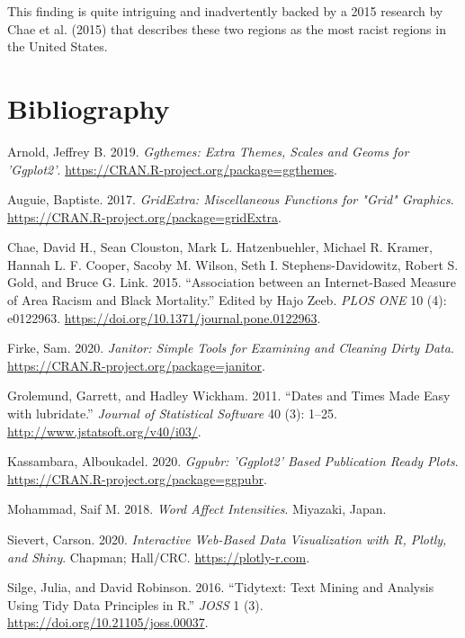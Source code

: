 \documentclass[
]{article}
\begin{document}
This finding is quite intriguing and inadvertently backed by a 2015 research by Chae et al. (2015) that describes these two regions as the most racist regions in the United States.

\hypertarget{bibliography}{%
\section*{Bibliography}\label{bibliography}}

\hypertarget{refs}{}
\leavevmode\hypertarget{ref-ggthemes}{}%
Arnold, Jeffrey B. 2019. \emph{Ggthemes: Extra Themes, Scales and Geoms for 'Ggplot2'}. \url{https://CRAN.R-project.org/package=ggthemes}.

\leavevmode\hypertarget{ref-gridextra}{}%
Auguie, Baptiste. 2017. \emph{GridExtra: Miscellaneous Functions for "Grid" Graphics}. \url{https://CRAN.R-project.org/package=gridExtra}.

\leavevmode\hypertarget{ref-journal}{}%
Chae, David H., Sean Clouston, Mark L. Hatzenbuehler, Michael R. Kramer, Hannah L. F. Cooper, Sacoby M. Wilson, Seth I. Stephens-Davidowitz, Robert S. Gold, and Bruce G. Link. 2015. ``Association between an Internet-Based Measure of Area Racism and Black Mortality.'' Edited by Hajo Zeeb. \emph{PLOS ONE} 10 (4): e0122963. \url{https://doi.org/10.1371/journal.pone.0122963}.

\leavevmode\hypertarget{ref-janitor}{}%
Firke, Sam. 2020. \emph{Janitor: Simple Tools for Examining and Cleaning Dirty Data}. \url{https://CRAN.R-project.org/package=janitor}.

\leavevmode\hypertarget{ref-lubridate}{}%
Grolemund, Garrett, and Hadley Wickham. 2011. ``Dates and Times Made Easy with lubridate.'' \emph{Journal of Statistical Software} 40 (3): 1--25. \url{http://www.jstatsoft.org/v40/i03/}.

\leavevmode\hypertarget{ref-ggpubr}{}%
Kassambara, Alboukadel. 2020. \emph{Ggpubr: 'Ggplot2' Based Publication Ready Plots}. \url{https://CRAN.R-project.org/package=ggpubr}.

\leavevmode\hypertarget{ref-nrc}{}%
Mohammad, Saif M. 2018. \emph{Word Affect Intensities}. Miyazaki, Japan.

\leavevmode\hypertarget{ref-plotly}{}%
Sievert, Carson. 2020. \emph{Interactive Web-Based Data Visualization with R, Plotly, and Shiny}. Chapman; Hall/CRC. \url{https://plotly-r.com}.

\leavevmode\hypertarget{ref-tidytext}{}%
Silge, Julia, and David Robinson. 2016. ``Tidytext: Text Mining and Analysis Using Tidy Data Principles in R.'' \emph{JOSS} 1 (3). \url{https://doi.org/10.21105/joss.00037}.
\end{document}
